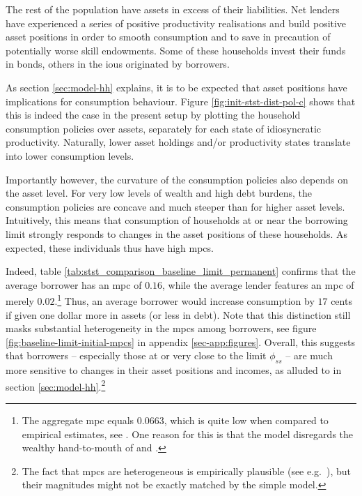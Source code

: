 \documentclass[12pt]{article} %
\numberwithin{equation}{section} %
\numberwithin{figure}{section}
\numberwithin{table}{section}
\begin{document}
The rest of the population have assets in excess of their liabilities. Net lenders have experienced a series of positive productivity realisations and build positive asset positions in order to smooth consumption and to save in precaution of potentially worse skill endowments. Some of these households invest their funds in bonds, others in the \Gls{iou}s originated by borrowers.

As section \ref{sec:model-hh} explains, it is to be expected that asset positions have implications for consumption behaviour. Figure \ref{fig:init-stst-dist-pol-c} shows that this is indeed the case in the present setup by plotting the household consumption policies over assets, separately for each state of idiosyncratic productivity. Naturally, lower asset holdings and/or productivity states translate into lower consumption levels. 

Importantly however, the curvature of the consumption policies also depends on the asset level. For very low levels of wealth and high debt burdens, the consumption policies are concave and much steeper than for higher asset levels. Intuitively, this means that consumption of households at or near the borrowing limit strongly responds to changes in the asset positions of these households. As expected, these individuals thus have high \Gls{mpc}s.

Indeed, table \ref{tab:stst_comparison_baseline_limit_permanent} confirms that the average borrower has an \Gls{mpc} of $0.16$, while the average lender features an \Gls{mpc} of merely $0.02$.\footnote{The aggregate \Gls{mpc} equals $0.0663$, which is quite low when compared to empirical estimates, see \textcite{kaplan2018}. One reason for this is that the model disregards the wealthy hand-to-mouth of \textcite{kaplan2014} and \textcite{kaplan2018}.} Thus, an average borrower would increase consumption by $17$ cents if given one dollar more in assets (or less in debt). Note that this distinction still masks substantial heterogeneity in the \Gls{mpc}s among borrowers, see figure \ref{fig:baseline-limit-initial-mpcs} in appendix \ref{sec-app:figures}. Overall, this suggests that borrowers -- especially those at or very close to the limit $\phi_{ss}$ -- are much more sensitive to changes in their asset positions and incomes, as alluded to in section \ref{sec:model-hh}.\footnote{The fact that \Gls{mpc}s are heterogeneous is empirically plausible (see e.g.~\cite{gross2002}), but their magnitudes might not be exactly matched by the simple model.}

\end{document}
